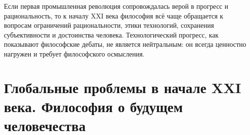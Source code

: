 \documentclass[12pt,a4paper]{article}
\begin{document}
	Если первая промышленная революция сопровождалась верой в прогресс и рациональность, то к началу XXI века философия всё чаще обращается к вопросам ограничений рациональности, этики технологий, сохранения субъективности и достоинства человека. Технологический прогресс, как показывают философские дебаты, не является нейтральным: он всегда ценностно нагружен и требует философского осмысления.
	
	\section{Глобальные проблемы в начале XXI века. Философия о будущем человечества}
	
\end{document}
